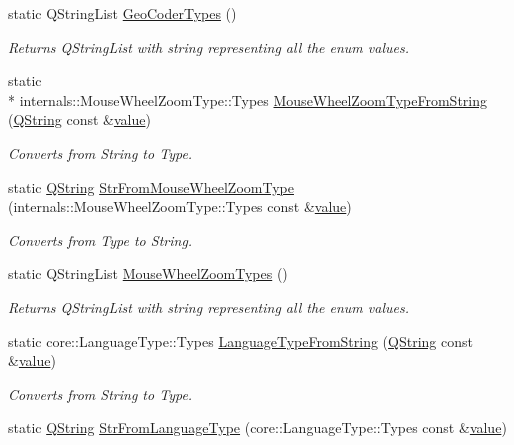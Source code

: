 \begin{DoxyCompactItemize}
static Q\-String\-List \hyperlink{group___o_p_map_widget_ga461898c6bdb8fe425dc78ff470a9867a}{Geo\-Coder\-Types} ()
\begin{DoxyCompactList}\small\item\em Returns Q\-String\-List with string representing all the enum values. \end{DoxyCompactList}\item 
static \\*
internals\-::\-Mouse\-Wheel\-Zoom\-Type\-::\-Types \hyperlink{group___o_p_map_widget_gab829c562d2443c5ffbe2c7d4b7071712}{Mouse\-Wheel\-Zoom\-Type\-From\-String} (\hyperlink{group___u_a_v_objects_plugin_gab9d252f49c333c94a72f97ce3105a32d}{Q\-String} const \&\hyperlink{glext_8h_aa0e2e9cea7f208d28acda0480144beb0}{value})
\begin{DoxyCompactList}\small\item\em Converts from String to Type. \end{DoxyCompactList}\item 
static \hyperlink{group___u_a_v_objects_plugin_gab9d252f49c333c94a72f97ce3105a32d}{Q\-String} \hyperlink{group___o_p_map_widget_ga66a0a97a25bc6f0c8e79a87e466a04b2}{Str\-From\-Mouse\-Wheel\-Zoom\-Type} (internals\-::\-Mouse\-Wheel\-Zoom\-Type\-::\-Types const \&\hyperlink{glext_8h_aa0e2e9cea7f208d28acda0480144beb0}{value})
\begin{DoxyCompactList}\small\item\em Converts from Type to String. \end{DoxyCompactList}\item 
static Q\-String\-List \hyperlink{group___o_p_map_widget_ga445f36c5148af8c77ebdf64269134267}{Mouse\-Wheel\-Zoom\-Types} ()
\begin{DoxyCompactList}\small\item\em Returns Q\-String\-List with string representing all the enum values. \end{DoxyCompactList}\item 
static core\-::\-Language\-Type\-::\-Types \hyperlink{group___o_p_map_widget_ga1a7989d295311b564112f0adc0e9158d}{Language\-Type\-From\-String} (\hyperlink{group___u_a_v_objects_plugin_gab9d252f49c333c94a72f97ce3105a32d}{Q\-String} const \&\hyperlink{glext_8h_aa0e2e9cea7f208d28acda0480144beb0}{value})
\begin{DoxyCompactList}\small\item\em Converts from String to Type. \end{DoxyCompactList}\item 
static \hyperlink{group___u_a_v_objects_plugin_gab9d252f49c333c94a72f97ce3105a32d}{Q\-String} \hyperlink{group___o_p_map_widget_gaeb691bec877a44aa5e4270efaa965c2a}{Str\-From\-Language\-Type} (core\-::\-Language\-Type\-::\-Types const \&\hyperlink{glext_8h_aa0e2e9cea7f208d28acda0480144beb0}{value})

\end{DoxyCompactItemize}
